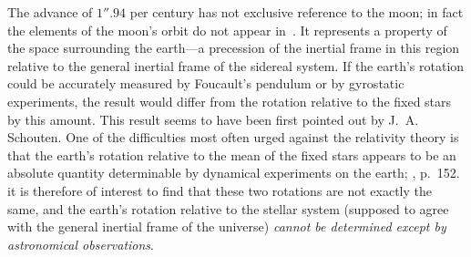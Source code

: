 \documentclass[12pt]{book}
\begin{document}
The advance of $1''.94$ per century has not exclusive reference to the
%
%
%
%
%
%
moon; in fact the elements of the moon's orbit do not appear in~. It
represents a property of the space surrounding the earth---a precession of the
inertial frame in this region relative to the general inertial frame of the sidereal
system. If the earth's rotation could be accurately measured by Foucault's
pendulum or by gyrostatic experiments, the result would differ from the
rotation relative to the fixed stars by this amount. This result seems to have
been first pointed out by J.~A. Schouten. One of the difficulties most often
urged against the relativity theory is that the earth's rotation relative to the
mean of the fixed stars appears to be an absolute quantity determinable by
dynamical experiments on the earth\footnotemark;\footnotetext
  {, p.~152.}
it is therefore of interest to find that
these two rotations are not exactly the same, and the earth's rotation relative
to the stellar system (supposed to agree with the general inertial frame of the
universe) \emph{cannot be determined except by astronomical observations}.
\end{document}
